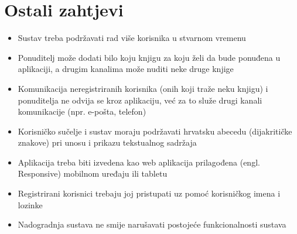 \documentclass[12pt]{report}
\begin{document}
\section{Ostali zahtjevi}
\begin{itemize}
	\item Sustav treba podržavati rad više korisnika u stvarnom vremenu
	\item Ponuditelj može dodati bilo koju knjigu za koju želi da bude ponuđena u aplikaciji, a drugim kanalima može nuditi neke druge knjige
	\item Komunikacija neregistriranih korisnika (onih koji traže neku knjigu) i ponuditelja ne odvija se kroz aplikaciju, već za to služe drugi kanali komunikacije (npr. e-pošta, telefon)
	\item Korisničko sučelje i sustav moraju podržavati hrvatsku abecedu (dijakritičke znakove) pri unosu i prikazu tekstualnog sadržaja
	\item Aplikacija treba biti izvedena kao web aplikacija prilagođena (engl. Responsive) mobilnom uređaju ili tabletu
	\item Registrirani korisnici trebaju joj pristupati uz pomoć korisničkog imena i lozinke
	\item Nadogradnja sustava ne smije narušavati postojeće funkcionalnosti sustava
\end{itemize}
\end{document}
